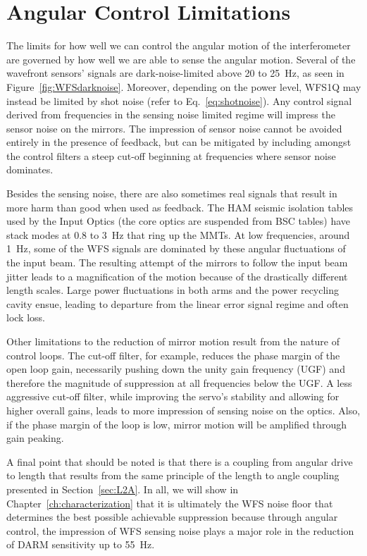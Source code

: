\section{Angular Control Limitations}
\label{sec:ASClimits}
The limits for how well we can control the angular motion of the interferometer are governed by how well we are able to sense the angular motion. Several of the wavefront sensors' signals are dark-noise-limited above 20 to 25~Hz, as seen in Figure~\ref{fig:WFSdarknoise}. Moreover, depending on the power level, WFS1Q may instead be limited by shot noise (refer to Eq.~\ref{eq:shotnoise}). Any control signal derived from frequencies in the sensing noise limited regime will impress the sensor noise on the mirrors. The impression of sensor noise cannot be avoided entirely in the presence of feedback, but can be mitigated by including amongst the control filters a steep cut-off beginning at frequencies where sensor noise dominates. 

Besides the sensing noise, there are also sometimes real signals that result in more harm than good when used as feedback. The HAM seismic isolation tables used by the Input Optics (the core optics are suspended from BSC tables) have stack modes at 0.8 to 3~Hz that ring up the MMTs.  At low frequencies, around 1~Hz, some of the WFS signals are dominated by these angular fluctuations of the input beam. The resulting attempt of the mirrors to follow the input beam jitter leads to a magnification of the motion because of the drastically different length scales. Large power fluctuations in both arms and the power recycling cavity ensue, leading to departure from the linear error signal regime and often lock loss. 

Other limitations to the reduction of mirror motion result from the nature of control loops. The cut-off filter, for example, reduces the phase margin of the open loop gain, necessarily pushing down the unity gain frequency (UGF) and therefore the magnitude of suppression at all frequencies below the UGF. A less aggressive cut-off filter, while improving the servo's stability and allowing for higher overall gains, leads to more impression of sensing noise on the optics. Also, if the phase margin of the loop is low, mirror motion will be amplified through gain peaking. 

A final point that should be noted is that there is a coupling from angular drive to length that results from the same principle of the length to angle coupling presented in Section~\ref{sec:L2A}. In all, we will show in Chapter~\ref{ch:characterization} that it is ultimately the WFS noise floor that determines the best possible achievable suppression because through angular control, the impression of WFS sensing noise plays a major role in the reduction of DARM sensitivity up to 55~Hz.
